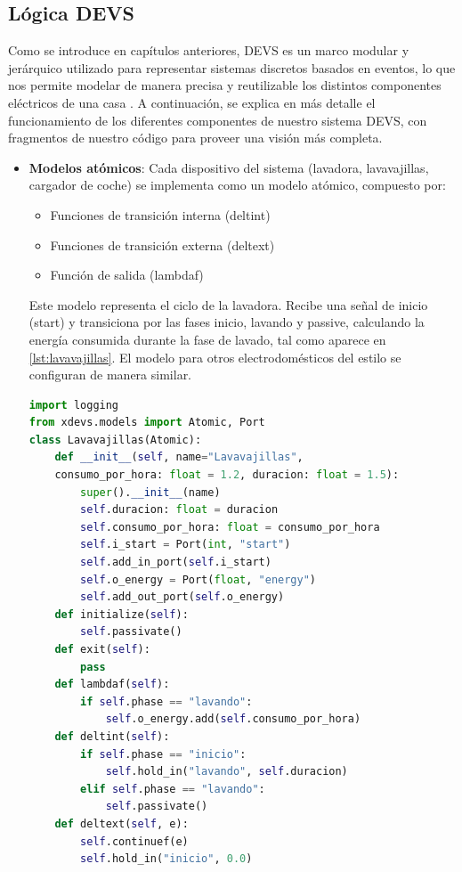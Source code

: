 \documentclass[11pt,a4paper]{book}
\begin{document}
\subsection{Lógica DEVS}
Como se introduce en capítulos anteriores, DEVS es un marco modular y jerárquico utilizado para representar sistemas discretos basados en eventos, lo que nos permite modelar de manera precisa y reutilizable los distintos componentes eléctricos de una casa \cite{fardSimulated2020, Zeigler2018}. A continuación, se explica en más detalle el funcionamiento de los diferentes componentes de nuestro sistema DEVS, con fragmentos de nuestro código para proveer una visión más completa.


\begin{itemize}
    \item \textbf{Modelos atómicos}: Cada dispositivo del sistema (lavadora, lavavajillas, cargador de coche) se implementa como un modelo atómico, compuesto por:
    \begin{itemize}
    \item Funciones de transición interna (deltint)
    \item Funciones de transición externa (deltext)
    \item Función de salida (lambdaf)
    \end{itemize}
    Este modelo representa el ciclo de la lavadora. Recibe una señal de inicio (start) y transiciona por las fases inicio, lavando y passive, calculando la energía consumida durante la fase de lavado, tal como aparece en \autoref{lst:lavavajillas}. El modelo para otros electrodomésticos del estilo se configuran de manera similar.

\begin{lstlisting}[language=Python, caption={Modelo \texttt{Lavavajillas} en DEVS}, label={lst:lavavajillas}]
import logging
from xdevs.models import Atomic, Port
class Lavavajillas(Atomic):
    def __init__(self, name="Lavavajillas", 
    consumo_por_hora: float = 1.2, duracion: float = 1.5):
        super().__init__(name)
        self.duracion: float = duracion
        self.consumo_por_hora: float = consumo_por_hora
        self.i_start = Port(int, "start")
        self.add_in_port(self.i_start)
        self.o_energy = Port(float, "energy")
        self.add_out_port(self.o_energy)
    def initialize(self):
        self.passivate()
    def exit(self):
        pass
    def lambdaf(self):
        if self.phase == "lavando":
            self.o_energy.add(self.consumo_por_hora)
    def deltint(self):
        if self.phase == "inicio":
            self.hold_in("lavando", self.duracion)
        elif self.phase == "lavando":
            self.passivate()
    def deltext(self, e):
        self.continuef(e)
        self.hold_in("inicio", 0.0)
\end{lstlisting}


\end{itemize}
\end{document}
